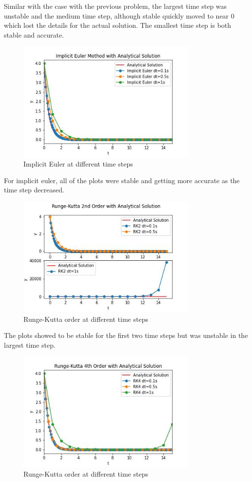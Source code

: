 \documentclass{article}
\begin{document}
		Similar with the case with the previous problem, the largest time step was unstable and the medium time step, although stable quickly moved to near 0 which lost the details for the actual solution. The smallest time step is both stable and accurate.
		\begin{figure}[H]
			\centering
			\includegraphics[width=0.8\textwidth]{images/imp2a.jpg}
			\caption{\label{} Implicit Euler at different time steps }
		\end{figure}
		For implicit euler, all of the plots were stable and getting more accurate as the time step decreased.
		\begin{figure}[H]
			\centering
			\includegraphics[width=0.8\textwidth]{images/rk22a.jpg}
			\caption{\label{} Runge-Kutta  order at different time steps}
		\end{figure}
		The plots showed to be stable for the first two time steps but was unstable in the largest time step. 
		\begin{figure}[H]
			\centering
			\includegraphics[width=0.8\textwidth]{images/rk42a.jpg}
			\caption{\label{} Runge-Kutta  order at different time steps}
		\end{figure}
\end{document}

